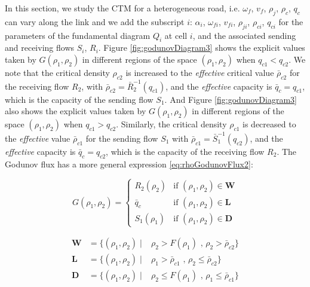 \documentclass[11pt]{article}
\numberwithin{equation}{section}
\numberwithin{figure}{section}
\numberwithin{table}{section}
\begin{document}
In this section, we study the CTM for a heterogeneous road, i.e. $\omega_{f}$, $v_{f}$, $\rho_{j}$, $\rho_{c}$, $q_{c}$ can vary along the link and we add the subscript $i$: $\alpha_{i}$, $\omega_{fi}$, $v_{fi}$, $\rho_{ji}$, $\rho_{ci}$, $q_{ci}$ for the parameters of the fundamental diagram $Q_{i}$ at cell $i$, and the associated sending and receiving flows $S_{i}$, $R_{i}$. Figure \ref{fig:godunovDiagram3} shows the explicit values taken by $G(\rho_{1},\rho_{2})$ in different regions of the space $(\rho_{1},\rho_{2})$ when $q_{c1} < q_{c2}$. We note that the critical density $\rho_{c2}$ is increased to the \textit{effective} critical value $\bar{\rho}_{c2}$ for the receiving flow $R_{2}$, with $\bar{\rho}_{c2} = \bar{R}^{-1}_{2}(q_{c1})$, and the \textit{effective} capacity is $\bar{q}_{c} = q_{c1}$, which is the capacity of the sending flow $S_{1}$. And Figure \ref{fig:godunovDiagram3} also shows the explicit values taken by $G(\rho_{1},\rho_{2})$ in different regions of the space $(\rho_{1},\rho_{2})$ when $q_{c1} > q_{c2}$. Similarly, the critical density $\rho_{c1}$ is decreased to the \textit{effective} value $\bar{\rho}_{c1}$ for the sending flow $S_{1}$ with $\bar{\rho}_{c1} = \bar{S}^{-1}_{1}(q_{c2})$, and the \textit{effective} capacity is $\bar{q}_{c} = q_{c2}$, which is the capacity of the receiving flow $R_{2}$. The Godunov flux has a more general expression \ref{eq:rhoGodunovFlux2}:

\begin{equation}
G(\rho_{1},\rho_{2}) = \begin{cases}
R_{2}(\rho_{2}) & \text{if } (\rho_{1},\rho_{2}) \in \textbf{W}\\
\bar{q}_{c} & \text{if } (\rho_{1},\rho_{2}) \in \textbf{L}\\
S_{1}(\rho_{1}) & \text{if } (\rho_{1},\rho_{2}) \in \textbf{D}
\end{cases}
\label{eq:rhoGodunovFlux2}
\end{equation}

\begin{equation}
\begin{array}{lll}
\textbf{W} & = \{(\rho_{1},\rho_{2}) \mid & \rho_{2} > F(\rho_{1}) \text{ ,   } \rho_{2} > \bar{\rho}_{c2}\}\\
\textbf{L} & = \{(\rho_{1},\rho_{2}) \mid & \rho_{1} > \bar{\rho}_{c1} \text{ ,   } \rho_{2} \leq \bar{\rho}_{c2}\}\\
\textbf{D} & = \{(\rho_{1},\rho_{2}) \mid & \rho_{2} \leq F(\rho_{1}) \text{ ,   } \rho_{1} \leq \bar{\rho}_{c1}\}
\end{array}
\label{eq:regionsHetero}
\end{equation}
\end{document}
